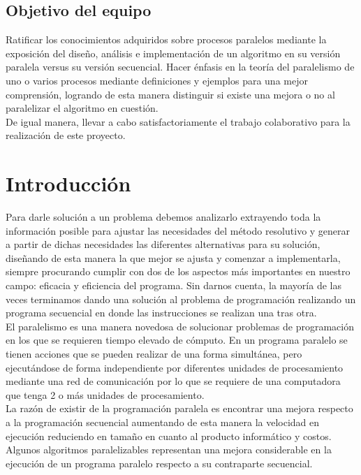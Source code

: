 \documentclass{article}
\begin{document}
\subsection{Objetivo del equipo}
Ratificar los conocimientos adquiridos sobre procesos paralelos mediante la exposición del diseño, análisis e implementación de un algoritmo en su versión paralela versus su versión secuencial. Hacer énfasis en la teoría del paralelismo de uno o varios procesos mediante definiciones y ejemplos para una mejor comprensión, logrando de esta manera distinguir si existe una mejora o no al paralelizar el algoritmo en cuestión. \\

De igual manera, llevar a cabo satisfactoriamente el trabajo colaborativo para la realización de este proyecto. 
\section{Introducción}
Para darle solución a un problema debemos analizarlo extrayendo toda la información posible para ajustar las necesidades del método resolutivo y generar a partir de dichas necesidades las diferentes alternativas para su solución, diseñando de esta manera la que mejor se ajusta y comenzar a implementarla, siempre procurando cumplir con dos de los aspectos más importantes en nuestro campo: eficacia y eficiencia del programa. Sin darnos cuenta, la mayoría de las veces terminamos dando una solución al problema de programación realizando un programa secuencial en donde las instrucciones se realizan una tras otra.\\

El paralelismo es una manera novedosa de solucionar problemas de programación en los que se requieren tiempo elevado de cómputo. En un programa paralelo se tienen acciones que se pueden realizar de una forma simultánea, pero ejecutándose de forma independiente por diferentes unidades de procesamiento mediante una red de comunicación por lo que se requiere de una computadora que tenga 2 o más unidades de procesamiento.\\

La razón de existir de la programación paralela es encontrar una mejora respecto a la programación secuencial aumentando de esta manera la velocidad en ejecución reduciendo en tamaño en cuanto al producto informático y costos. Algunos algoritmos paralelizables representan una mejora considerable en la ejecución de un programa paralelo respecto a su contraparte secuencial. \\
\end{document}

